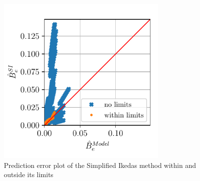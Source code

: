 \begin{figure}[!htb]
    \centering
    \includegraphics[width=0.75\textwidth]{kappa/images/si_model_within.pdf}
    \vspace{-0.5cm}
    \caption{Prediction error plot of the Simplified Ikedas method within and outside its limits}
    \label{fig:si_model_within}
\end{figure}



